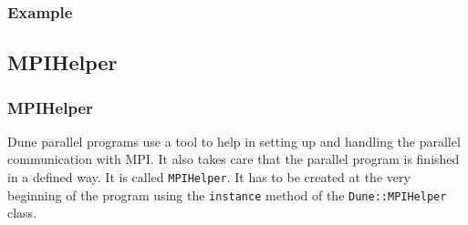 \documentclass[aspectratio=169,11pt]{beamer}
\theoremstyle{definition}
\begin{document}
\begin{frame}
  \frametitle{Example}

\end{frame}

\subsection{MPIHelper}
\begin{frame}[fragile]
  \frametitle<presentation>{MPIHelper}
  Dune parallel programs use a tool to help in setting up and handling the
parallel communication with MPI. It also takes care that the parallel program
is finished in a defined way. It is called \lstinline!MPIHelper!. It has to be
created at the very beginning of the program
using the \lstinline!instance! method of the \lstinline!Dune::MPIHelper! class.


\end{frame}
\end{document}
